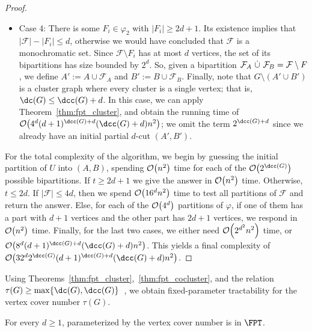 \begin{proof}
\begin{itemize}
        \item Case 4: There is some $F_i \in \varphi_2$ with $|F_i| \geq 2d + 1$.
        Its existence implies that $|\mathcal{F}| - |F_i| \leq d$, otherwise we would have concluded that $\mathcal{F}$ is a monochromatic set.
        Since $\mathcal{F} \setminus F_i$ has at most $d$ vertices, the set of its bipartitions has size bounded by $2^d$.
        So, given a bipartition $\mathcal{F}_A \ \dot\cup\  \mathcal{F}_B = \mathcal{F} \setminus F$, we define $A' := A \cup \mathcal{F}_A$ and $B' := B \cup \mathcal{F}_B$.
        Finally, note that $G \setminus (A' \cup B')$ is a cluster graph where every cluster is a single vertex; that is, $\dc(G) \leq \dcc(G) + d$.
        In this case, we can apply Theorem~\ref{thm:fpt_cluster}, and obtain the running time of $\bigO{4^d(d+1)^{\dcc(G)+d}(\dcc(G)+d)n^2}$; we omit the term $2^{\dcc(G) + d}$ since we already have an initial partial $d$-cut $(A', B')$.
    \end{itemize}

    For the total complexity of the algorithm, we begin by guessing the initial partition of $U$ into $(A,B)$, spending $\mathcal{O}\!\left(n^2\right)$ time for each of the $\bigO{2^{\dcc(G)}}$ possible bipartitions.
    If $t \geq 2d+1$ we give the answer in $\mathcal{O}\!\left(n^2\right)$ time.
    Otherwise, $t \leq 2d$.
    If $|\mathcal{F}| \leq 4d$, then we spend $\mathcal{O}\!\left(16^dn^2\right)$ time to test all partitions of $\mathcal{F}$ and return the answer.
    Else, for each of the $\mathcal{O}\!\left(4^d\right)$ partitions of $\varphi$, if one of them has a part with $d+1$ vertices and the other part has $2d+1$ vertices, we respond in $\mathcal{O}\!\left(n^2\right)$ time.
    Finally, for the last two cases, we either need $\mathcal{O}\!\left(2^{d^2}n^2\right)$ time, or $\bigO{8^d(d+1)^{\dcc(G)+d}(\dcc(G)+d)n^2}$.
    This yields a final complexity of $\bigO{32^d2^{\dcc(G)}(d+1)^{\dcc(G)+d}(\dcc(G)+d)n^2}$.
\end{proof}

Using Theorems~\ref{thm:fpt_cluster},~\ref{thm:fpt_cocluster}, and the relation $\tau(G) \geq \max\{\dc(G), \dcc(G)\}$~\cite{matching_cut_ipec}, we obtain fixed-parameter tractability for the vertex cover number $\tau(G)$.

\begin{corollary}
    For every $d \geq 1$,  parameterized by the vertex cover number is in $\FPT$.
\end{corollary}
